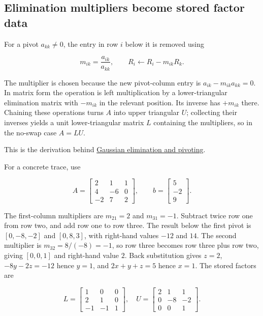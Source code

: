 \subsection{Elimination multipliers become stored factor data}\label{01-foundations-i-ch019-elimination-multipliers-become-stored-factor-data}

\hypertarget{01-foundations-i-ch019-elimination-multipliers-become-stored-factor-data}{}

For a pivot \(a_{kk}\ne0\), the entry in row \(i\) below it is removed using

\[
m_{ik}=\frac{a_{ik}}{a_{kk}},\qquad R_i\leftarrow R_i-m_{ik}R_k.
\]

The multiplier is chosen because the new pivot-column entry is \(a_{ik}-m_{ik}a_{kk}=0\). In matrix form the operation is left multiplication by a lower-triangular elimination matrix with \(-m_{ik}\) in the relevant position. Its inverse has \(+m_{ik}\) there. Chaining these operations turns \(A\) into upper triangular \(U\); collecting their inverses yields a unit lower-triangular matrix \(L\) containing the multipliers, so in the no-swap case \(A=LU\).

This is the derivation behind \hyperref[01-foundations-i-ch019-elimination-turns-the-geometry-into-an-auditable-calculation]{Gaussian elimination and pivoting}.

For a concrete trace, use

\[
A=\begin{bmatrix}2&1&1\\4&-6&0\\-2&7&2\end{bmatrix},\qquad
b=\begin{bmatrix}5\\-2\\9\end{bmatrix}.
\]

The first-column multipliers are \(m_{21}=2\) and \(m_{31}=-1\). Subtract twice row one from row two, and add row one to row three. The result below the first pivot is \([0,-8,-2]\) and \([0,8,3]\), with right-hand values \(-12\) and \(14\). The second multiplier is \(m_{32}=8/(-8)=-1\), so row three becomes row three plus row two, giving \([0,0,1]\) and right-hand value \(2\). Back substitution gives \(z=2\), \(-8y-2z=-12\) hence \(y=1\), and \(2x+y+z=5\) hence \(x=1\). The stored factors are

\[
L=\begin{bmatrix}1&0&0\\2&1&0\\-1&-1&1\end{bmatrix},\quad
U=\begin{bmatrix}2&1&1\\0&-8&-2\\0&0&1\end{bmatrix}.
\]

